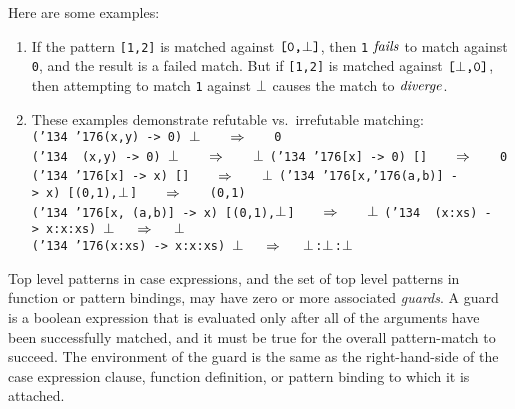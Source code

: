 Here are some examples:
\begin{enumerate}
\item If the pattern \mbox{\tt [1,2]} is matched against \mbox{$\it \makebox{\tt [0,}\bot\makebox{\tt ]}$}, then \mbox{\tt 1}
\mbox{$\it fails$} to match against \mbox{\tt 0}, and the result is a failed match.  But
if \mbox{\tt [1,2]} is matched against \mbox{$\it \makebox{\tt [}\bot\makebox{\tt ,0]}$}, then attempting to match
\mbox{\tt 1} against \mbox{$\it \bot$} causes the match to \mbox{$\it diverge$}.

\item These examples demonstrate refutable vs.~irrefutable
matching:
\nopagebreak[4]
\bprog
\mbox{\tt ({\char'134}\ {\char'176}(x,y)\ ->\ 0)\ }\mbox{$\it \bot$}\mbox{\tt \ \ \ \ }\mbox{$\it \Rightarrow$}\mbox{\tt \ \ \ \ 0}\\
\mbox{\tt ({\char'134}\ \ (x,y)\ ->\ 0)\ }\mbox{$\it \bot$}\mbox{\tt \ \ \ \ }\mbox{$\it \Rightarrow$}\mbox{\tt \ \ \ \ }\mbox{$\it \bot$}\mbox{\tt }
\eprog
\bprog
\mbox{\tt ({\char'134}\ {\char'176}[x]\ ->\ 0)\ []\ \ \ \ }\mbox{$\it \Rightarrow$}\mbox{\tt \ \ \ \ 0}\\
\mbox{\tt ({\char'134}\ {\char'176}[x]\ ->\ x)\ []\ \ \ \ }\mbox{$\it \Rightarrow$}\mbox{\tt \ \ \ \ }\mbox{$\it \bot$}\mbox{\tt }
\eprog
\bprog
\mbox{\tt ({\char'134}\ {\char'176}[x,{\char'176}(a,b)]\ ->\ x)\ [(0,1),}\mbox{$\it \bot$}\mbox{\tt ]\ \ \ \ }\mbox{$\it \Rightarrow$}\mbox{\tt \ \ \ \ (0,1)}\\
\mbox{\tt ({\char'134}\ {\char'176}[x,\ (a,b)]\ ->\ x)\ [(0,1),}\mbox{$\it \bot$}\mbox{\tt ]\ \ \ \ }\mbox{$\it \Rightarrow$}\mbox{\tt \ \ \ \ }\mbox{$\it \bot$}\mbox{\tt }
\eprog
\bprog
\mbox{\tt ({\char'134}\ \ (x:xs)\ ->\ x:x:xs)\ }\mbox{$\it \bot$}\mbox{\tt \ \ \ }\mbox{$\it \Rightarrow$}\mbox{\tt \ \ \ }\mbox{$\it \bot$}\mbox{\tt }\\
\mbox{\tt ({\char'134}\ {\char'176}(x:xs)\ ->\ x:x:xs)\ }\mbox{$\it \bot$}\mbox{\tt \ \ \ }\mbox{$\it \Rightarrow$}\mbox{\tt \ \ \ }\mbox{$\it \bot$}\mbox{\tt :}\mbox{$\it \bot$}\mbox{\tt :}\mbox{$\it \bot$}\mbox{\tt }
\eprogNoSkip
\end{enumerate}

Top level patterns in case
expressions, and the set of top level patterns in function or pattern
bindings, may have zero or more associated {\em guards}.  A guard is
a boolean expression that is evaluated only after all of the
arguments have been successfully matched, and it must be true for the
overall pattern-match to succeed.  The environment of the guard is the same
as the right-hand-side of the case expression
clause, function definition, or pattern binding to which it is attached.

